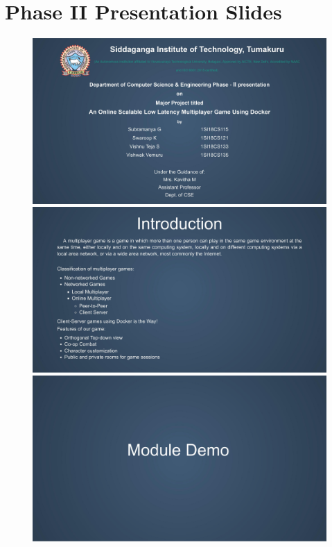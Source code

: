 \documentclass[oneside,12pt]{Classes/VTU}
\begin{document}
\section*{Phase II Presentation Slides}
	\begin{figure}[ht!]
		\centering
		\includegraphics[scale=0.3]{0001.jpg}\vfill
		\includegraphics[scale=0.3]{0002.jpg}\vfill
		\includegraphics[scale=0.3]{0003.jpg}\vfill
	\end{figure}
\end{document}
